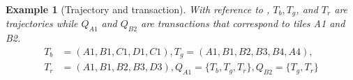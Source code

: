 \documentclass[
]{ceurart}
\newtheorem{example}{Example}
\begin{document}
\begin{example}[Trajectory and transaction]
With reference to , 
$T_b,T_g$, and $T_r$ are trajectories while $Q_{A1}$ and $Q_{B2}$ are transactions that correspond to tiles A1 and B2.
{\small
\begin{align*}
    T_b&= (A1, B1, C1, D1, C1),
    T_g = (A1, B1, B2, B3, B4, A4),\\
    T_r&= (A1, B1, B2, B3, D3),Q_{A1}=\{T_b, T_g, T_r \},Q_{B2}= \{T_g, T_r \}
\end{align*}
}
\end{example}
%
\end{document}
